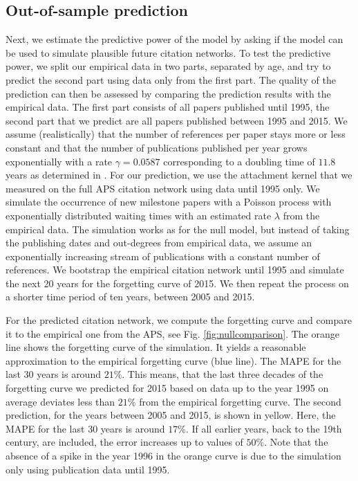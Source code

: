 \documentclass[draft,final]{vutinfth} %
\begin{document}
\subsection{Out-of-sample prediction} Next, we estimate the predictive power of the model by asking if the model can be used to simulate plausible future citation networks. To test the predictive power, we split our empirical data in two parts, separated by age, and try to predict the second part using data only from the first part. The quality of the prediction can then be assessed by comparing the prediction results with the empirical data. The first part consists of all papers published until 1995, the second part that we predict are all papers published between 1995 and 2015. We assume (realistically) that the number of references per paper stays more or less constant and that the number of publications published per year grows exponentially with a rate $\gamma = 0.0587$ corresponding to a doubling time of $11.8$ years as determined in \cite{Martin2013}. For our prediction, we use the attachment kernel that we measured on the full APS citation network using data until 1995 only. We simulate the occurrence of new milestone papers with a Poisson process with exponentially distributed waiting times with an estimated rate $\lambda$ from the empirical data. The simulation works as for the null model, but instead of taking the publishing dates and out-degrees from empirical data, we assume an exponentially increasing stream of publications with a constant number of references. We bootstrap the empirical citation network until 1995 and simulate the next 20 years for the forgetting curve of 2015. We then repeat the process on a shorter time period of ten years, between 2005 and 2015.

For the predicted citation network, we compute the forgetting curve and compare it to the empirical one from the APS, see Fig. \ref{fig:nullcomparison}. The orange line shows the forgetting curve of the simulation. It yields a reasonable  approximation to the empirical forgetting curve (blue line). The MAPE for the last 30 years is around $21\%$. This means, that the last three decades of the forgetting curve we predicted for 2015 based on data up to the year 1995 on average deviates  less than $21\%$ from the empirical forgetting curve. The second prediction, for the years between 2005 and 2015, is shown in yellow. Here, the MAPE for the last 30 years is around $17\%$. If all earlier years, back to the 19th century, are included, the error increases up to values of $50\%$. Note that the absence of a spike in the year 1996 in the orange curve is due to the simulation only using publication data until 1995. 
\end{document}
